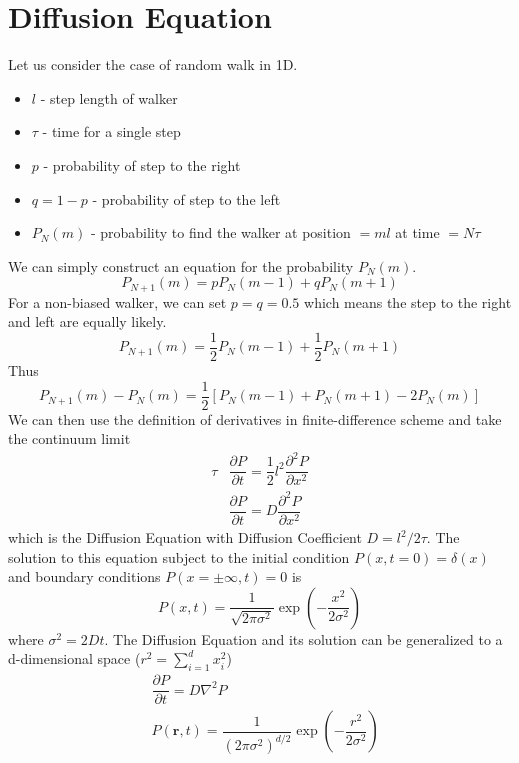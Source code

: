 \documentclass[aps,prb,onecolumn,notitlepage,showpacs,floatfix,superscriptaddress]{revtex4-1}
\begin{document}
\section{Diffusion Equation}
Let us consider the case of random walk in 1D.
\begin{itemize}
\item $l$ - step length of walker
\item $\tau$ - time for a single step
\item $p$ - probability of step to the right
\item $q=1-p$ - probability of step to the left
\item $P_N(m)$ - probability to find the walker at position $=ml$ at time $=N\tau$
\end{itemize}
We can simply construct an equation for the probability $P_N(m)$. 
\begin{equation}
P_{N+1}(m)=p P_N(m-1) +q P_N(m+1)
\end{equation}
For a non-biased walker, we can set $p=q=0.5$ which means the step to the right and left are equally likely.
\begin{equation}
P_{N+1}(m)=\dfrac{1}{2} P_N(m-1) + \dfrac{1}{2} P_N(m+1)
\end{equation}
Thus
\begin{equation}
P_{N+1}(m) - P_N(m)=\dfrac{1}{2} \left[ P_N(m-1) +  P_N(m+1) - 2P_N(m) \right]
\end{equation}
We can then use the definition of derivatives in finite-difference scheme and take the continuum limit
\begin{equation}
\begin{split}
\tau &\dfrac{\partial P}{\partial t} = \dfrac{1}{2} l^2 \dfrac{\partial^2 P}{\partial x^2}\\
&\dfrac{\partial P}{\partial t} =  D \dfrac{\partial^2 P}{\partial x^2}
\end{split}
\end{equation}
which is the Diffusion Equation with Diffusion Coefficient $D=l^2/2\tau$. The solution to this equation subject to the initial condition $P(x,t=0)=\delta(x)$ and boundary conditions $P(x=\pm\infty,t)=0$ is
\begin{equation}
P(x,t)=\dfrac{1}{\sqrt{2\pi \sigma^2}} \exp\left( -\dfrac{x^2}{2\sigma^2}\right)
\end{equation}
where $\sigma^2=2Dt$. The Diffusion Equation and its solution can be generalized to a d-dimensional space ($r^2=\sum_{i=1}^d x_i^2$)
\begin{equation}
\begin{split}
&\dfrac{\partial P}{\partial t} =  D \nabla^2 P \\
& P({\bm r},t)= \dfrac{1}{(2\pi \sigma^2)^{d/2}} \exp\left( -\dfrac{r^2}{2\sigma^2}\right)
\end{split}
\end{equation}
\end{document}
